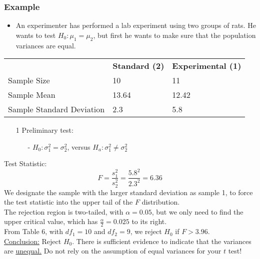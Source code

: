 \documentclass[12pt, letterpaper]{article}
\begin{document}
            \subsubsection*{Example}
                \begin{itemize}
                    \item An experimenter has performed a lab experiment using two groups of rats. He wants to test $H_0: \mu_1 = \mu_2$, but first he wants to make sure that the population variances are equal.
                \end{itemize}
                \begin{center}
                    \begin{tabular}{|l|l|l|} \cline{1-3}
                        & \textbf{Standard (2)} & \textbf{Experimental (1)} \\ \cline{1-3}
                        Sample Size & 10 & 11 \\ \cline{1-3}
                        Sample Mean & 13.64 & 12.42 \\ \cline{1-3}
                        Sample Standard Deviation & 2.3 & 5.8 \\ \cline{1-3}
                    \end{tabular}
                \end{center}
                \begin{itemize}
                    \item[1] Preliminary test:
                    \begin{itemize}
                        \item[-] $H_0: \sigma^2_1 = \sigma^2_2$, versus $H_a: \sigma^2_1 \neq \sigma^2_2$
                    \end{itemize}
                \end{itemize}
                \begin{mdframed}[leftmargin=0.5cm, rightmargin=0.5cm]
                    Test Statistic:
                    \begin{equation*}
                        F = \frac{s_1^2}{s_2^2} = \frac{5.8^2}{2.3^2} = 6.36
                    \end{equation*}
                    We designate the sample with the larger standard deviation as sample 1, to force the test statistic into the upper tail of the $F$ distribution. \\
                    The rejection region is two-tailed, with $\alpha = 0.05$, but we only need to find the upper critical value, which has $\frac{\alpha}{2} = 0.025$ to its right. \\ 
                    From Table 6, with $df_1 = 10$ and $df_2 = 9$, we reject $H_0$ if $F > 3.96$. \\
                    \underline{Conclusion:} Reject $H_0$. There is sufficient evidence to indicate that the variances are \underline{unequal.} Do not rely on the assumption of equal variances for your $t$ test!
                \end{mdframed}
\end{document}
